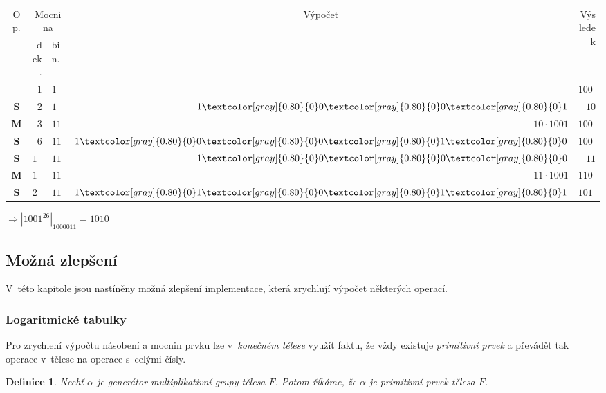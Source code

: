 \documentclass[thesis=M,czech,hidelinks]{FITthesis}[2012/06/26]
\newcommand{\0}{{\textcolor[gray]{0.80}{0}}}
\newtheorem{definice}{Definice}
\begin{document}
\begin{center}
    \begin{tabular}{c|r|l|r|r}
        \multirow{2}{*}{Op.} & \multicolumn{2}{c}{Mocnina} & \multicolumn{1}{c}{\multirow{2}{*}{Výpočet}} & \multirow{2}{*}{Výsledek} \\
                &  dek. & bin.    &                   &              \\
        \hline
        \hline
                & $  1$ & $1    $ &                   & $ 1001$      \\
        \hline
    \textbf{S}  & $  2$ & $1    $ & $    1\00\00\01 $ & $   10$      \\
    \textbf{M}  & $  3$ & $11   $ & $ 10 \cdot 1001 $ & $10010$      \\
        \hline
    \textbf{S}  & $  6$ & $110  $ & $ 1\00\00\01\00 $ & $ 1000$      \\
        \hline
    \textbf{S}  & $ 12$ & $1100 $ & $    1\00\00\00 $ & $   11$      \\
    \textbf{M}  & $ 13$ & $1101 $ & $ 11 \cdot 1001 $ & $11011$      \\
        \hline
    \textbf{S}  & $ 26$ & $11010$ & $     1\01\00\01\01 $ & $ 1010$      \\
    \end{tabular}
\end{center}

$ \Rightarrow \left|1001^{26}\right|_{1000011} = 1010 $

\subsection{Možná zlepšení}
V~této kapitole jsou nastíněny možná zlepšení implementace, která
zrychlují výpočet některých operací.

\subsubsection{Logaritmické tabulky}
Pro zrychlení výpočtu násobení a mocnin prvku lze v~\emph{konečném tělese}
využít faktu, že vždy existuje \emph{primitivní prvek} a převádět tak operace
v~tělese na operace s~celými čísly.

\begin{definice}
    Nechť $\alpha$ je \emph{generátor} \emph{multiplikativní grupy} tělesa $F$.
    Potom říkáme, že $\alpha$ je \emph{primitivní prvek} tělesa $F$.
\end{definice}
\end{document}
